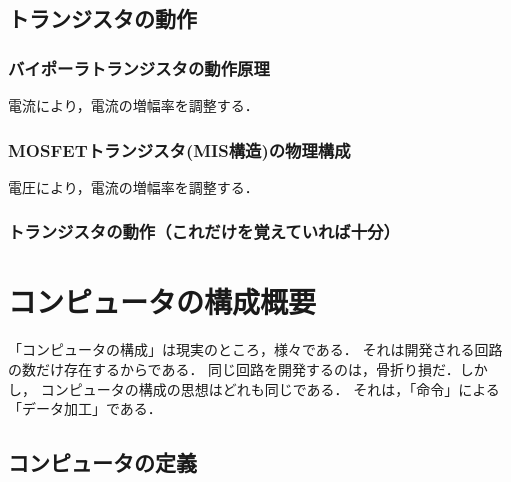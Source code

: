     \subsection{トランジスタの動作}
        \subsubsection{バイポーラトランジスタの動作原理}
        電流により，電流の増幅率を調整する．

        \subsubsection{MOSFETトランジスタ(MIS構造)の物理構成}
        電圧により，電流の増幅率を調整する．

        \subsubsection{トランジスタの動作（これだけを覚えていれば十分）}


    \section{コンピュータの構成概要}
    \begin{mycomment}
        「コンピュータの構成」は現実のところ，様々である．
        それは開発される回路の数だけ存在するからである．
        同じ回路を開発するのは，骨折り損だ．しかし，
        コンピュータの構成の思想はどれも同じである．
        それは，「命令」による「データ加工」である．
    \end{mycomment}

    \subsection{コンピュータの定義}
